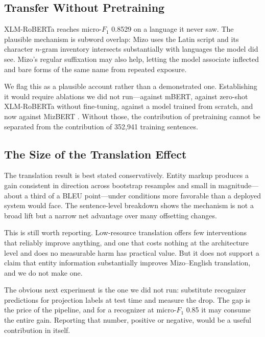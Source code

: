 \documentclass[acmsmall,screen,review]{acmart}
\begin{document}
\subsection{Transfer Without Pretraining}
\label{sec:discussion:transfer}

XLM-RoBERTa reaches micro-$F_1$ 0.8529 on a language it never saw. The plausible
mechanism is subword overlap: Mizo uses the Latin script and its character
$n$-gram inventory intersects substantially with languages the model did see.
Mizo's regular suffixation may also help, letting the model associate inflected
and bare forms of the same name from repeated exposure.

We flag this as a plausible account rather than a demonstrated one. Establishing
it would require ablations we did not run---against mBERT, against zero-shot
XLM-RoBERTa without fine-tuning, against a model trained from scratch, and now
against MizBERT \citep{lalramhluna2024mizbert}. Without those, the contribution
of pretraining cannot be separated from the contribution of 352,941 training
sentences.

\subsection{The Size of the Translation Effect}
\label{sec:discussion:mteffect}

The translation result is best stated conservatively. Entity markup produces a
gain consistent in direction across bootstrap resamples and small in
magnitude---about a third of a BLEU point---under conditions more favorable than
a deployed system would face. The sentence-level breakdown shows the mechanism
is not a broad lift but a narrow net advantage over many offsetting changes.

This is still worth reporting. Low-resource translation offers few interventions
that reliably improve anything, and one that costs nothing at the architecture
level and does no measurable harm has practical value. But it does not support a
claim that entity information substantially improves Mizo--English translation,
and we do not make one.

The obvious next experiment is the one we did not run: substitute recognizer
predictions for projection labels at test time and measure the drop. The gap is
the price of the pipeline, and for a recognizer at micro-$F_1$ 0.85 it may
consume the entire gain. Reporting that number, positive or negative, would be a
useful contribution in itself.
\end{document}
